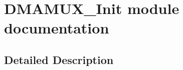 \hypertarget{group___d_m_a_m_u_x___init__module}{}\section{D\+M\+A\+M\+U\+X\+\_\+\+Init module documentation}
\label{group___d_m_a_m_u_x___init__module}


\subsection{Detailed Description}
